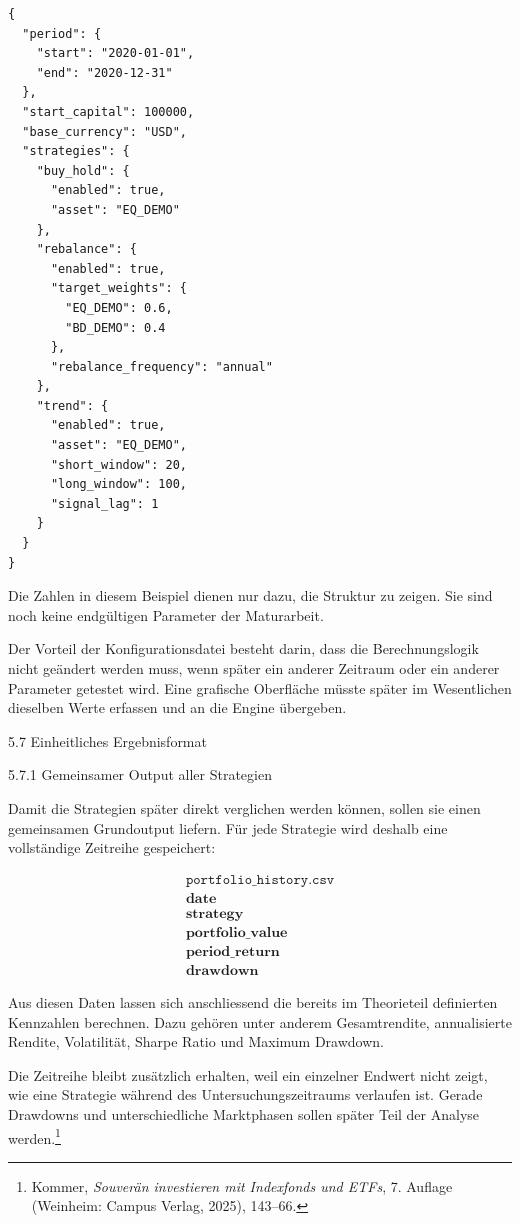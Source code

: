 \documentclass[
  ngerman,
  a4paper,
  DIV=11,
  oneside]{scrreprt}
\begin{document}
\begin{verbatim}
{
  "period": {
    "start": "2020-01-01",
    "end": "2020-12-31"
  },
  "start_capital": 100000,
  "base_currency": "USD",
  "strategies": {
    "buy_hold": {
      "enabled": true,
      "asset": "EQ_DEMO"
    },
    "rebalance": {
      "enabled": true,
      "target_weights": {
        "EQ_DEMO": 0.6,
        "BD_DEMO": 0.4
      },
      "rebalance_frequency": "annual"
    },
    "trend": {
      "enabled": true,
      "asset": "EQ_DEMO",
      "short_window": 20,
      "long_window": 100,
      "signal_lag": 1
    }
  }
}
\end{verbatim}

Die Zahlen in diesem Beispiel dienen nur dazu, die Struktur zu zeigen.
Sie sind noch keine endgültigen Parameter der Maturarbeit.

Der Vorteil der Konfigurationsdatei besteht darin, dass die
Berechnungslogik nicht geändert werden muss, wenn später ein anderer
Zeitraum oder ein anderer Parameter getestet wird. Eine grafische
Oberfläche müsste später im Wesentlichen dieselben Werte erfassen und an
die Engine übergeben.

5.7 Einheitliches Ergebnisformat

5.7.1 Gemeinsamer Output aller Strategien

Damit die Strategien später direkt verglichen werden können, sollen sie
einen gemeinsamen Grundoutput liefern. Für jede Strategie wird deshalb
eine vollständige Zeitreihe gespeichert:

\[
\begin{array}{l}
\texttt{portfolio\_history.csv} \\[6pt]
\textbf{date} \\
\textbf{strategy} \\
\textbf{portfolio\_value} \\
\textbf{period\_return} \\
\textbf{drawdown}
\end{array}
\]

Aus diesen Daten lassen sich anschliessend die bereits im Theorieteil
definierten Kennzahlen berechnen. Dazu gehören unter anderem
Gesamtrendite, annualisierte Rendite, Volatilität, Sharpe Ratio und
Maximum Drawdown.

Die Zeitreihe bleibt zusätzlich erhalten, weil ein einzelner Endwert
nicht zeigt, wie eine Strategie während des Untersuchungszeitraums
verlaufen ist. Gerade Drawdowns und unterschiedliche Marktphasen sollen
später Teil der Analyse werden.\footnote{Kommer, \emph{Souverän
  investieren mit Indexfonds und ETFs}, 7. Auflage (Weinheim: Campus
  Verlag, 2025), 143--66.}
\end{document}
